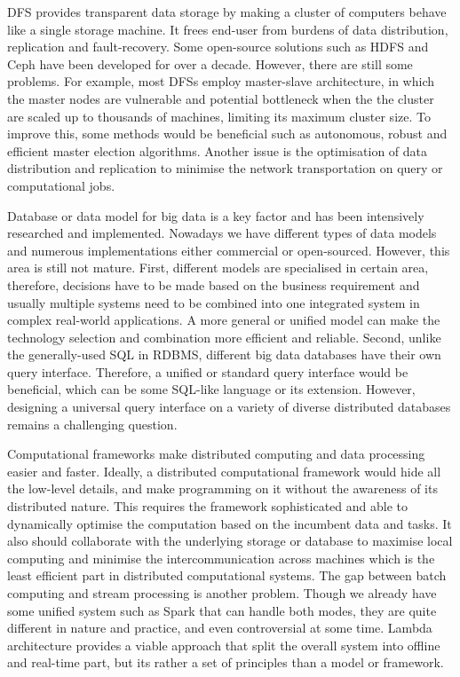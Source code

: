 \documentclass[conference]{IEEEtran}
\begin{document}
DFS provides transparent data storage by making a cluster of computers
behave like a single storage machine. It frees end-user from burdens of
data distribution, replication and fault-recovery. Some open-source
solutions such as HDFS and Ceph have been developed for over a decade.
However, there are still some problems. For example, most DFSs employ
master-slave architecture, in which the master nodes are vulnerable and
potential bottleneck when the the cluster are scaled up to thousands of
machines, limiting its maximum cluster size. To improve this, some
methods would be beneficial such as autonomous, robust and efficient
master election algorithms. Another issue is the optimisation of data
distribution and replication to minimise the network transportation on
query or computational jobs.

Database or data model for big data is a key factor and has been
intensively researched and implemented. Nowadays we have different types
of data models and numerous implementations either commercial or
open-sourced. However, this area is still not mature. First, different
models are specialised in certain area, therefore, decisions have to be
made based on the business requirement and usually multiple systems need
to be combined into one integrated system in complex real-world
applications. A more general or unified model can make the technology
selection and combination more efficient and reliable. Second, unlike
the generally-used SQL in RDBMS, different big data databases have their
own query interface. Therefore, a unified or standard query interface
would be beneficial, which can be some SQL-like language or its
extension. However, designing a universal query interface on a variety
of diverse distributed databases remains a challenging question.

Computational frameworks make distributed computing and data processing
easier and faster. Ideally, a distributed computational framework would
hide all the low-level details, and make programming on it without the
awareness of its distributed nature. This requires the framework
sophisticated and able to dynamically optimise the computation based on
the incumbent data and tasks. It also should collaborate with the
underlying storage or database to maximise local computing and minimise
the intercommunication across machines which is the least efficient part
in distributed computational systems. The gap between batch computing
and stream processing is another problem. Though we already have some
unified system such as Spark that can handle both modes, they are quite
different in nature and practice, and even controversial at some time.
Lambda architecture provides a viable approach that split the overall
system into offline and real-time part, but its rather a set of
principles than a model or framework.
\end{document}
